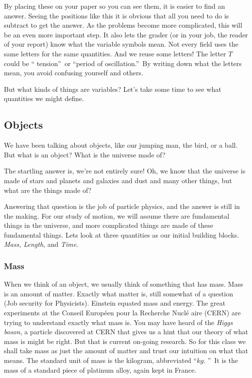 \documentclass[]{Book}
\begin{document}
By placing these on your paper so you can see them, it is easier to find an
answer. Seeing the positions like this it is obvious that all you need to do
is subtract to get the answer. As the problems become more complicated, this
will be an even more important step. It also lets the grader (or in your
job, the reader of your report) know what the variable symbols mean. Not
every field uses the same letters for the same quantities. And we reuse some
letters! The letter $T$ could be \textquotedblleft
tension\textquotedblright\ or \textquotedblleft period of
oscillation.\textquotedblright\ By writing down what the letters mean, you
avoid confusing yourself and others.

But what kinds of things are variables? Let's take some time to see what
quantities we might define.

\subsection{Objects}

We have been talking about objects, like our jumping man, the bird, or a
ball. But what is an object? What is the universe made of?

The startling answer is, we're not entirely sure! Oh, we know that the
universe is made of stars and planets and galaxies and dust and many other
things, but what are the things made of?

Answering that question is the job of particle physics, and the answer is
still in the making. For our study of motion, we will assume there are
fundamental things in the universe, and more complicated things are made of
these fundamental things. Lets look at three quantities as our initial
building blocks. \emph{Mass, Length}, and \emph{Time}.

\subsubsection{Mass}

When we think of an object, we usually think of something that has mass.
Mass is an amount of matter. Exactly what matter is, still somewhat of a
question (Job security for Physicists). Einstein equated mass and energy.
The great experiments at the Conseil Europ\'{e}en pour la Recherche Nucl\'{e}%
aire (CERN) are trying to understand exactly what mass is. You may have
heard of the \emph{Higgs boson}, a particle discovered at CERN that gives us
a hint that our theory of what mass is might be right. But that is current
on-going research. So for this class we shall take mass as just the amount
of matter and trust our intuition on what that means. The standard unit of
mass is the kilogram, abbreviated \textquotedblleft $\unit{kg}.$%
\textquotedblright\ It is the mass of a standard piece of platinum alloy,
again kept in France. 
\end{document}
